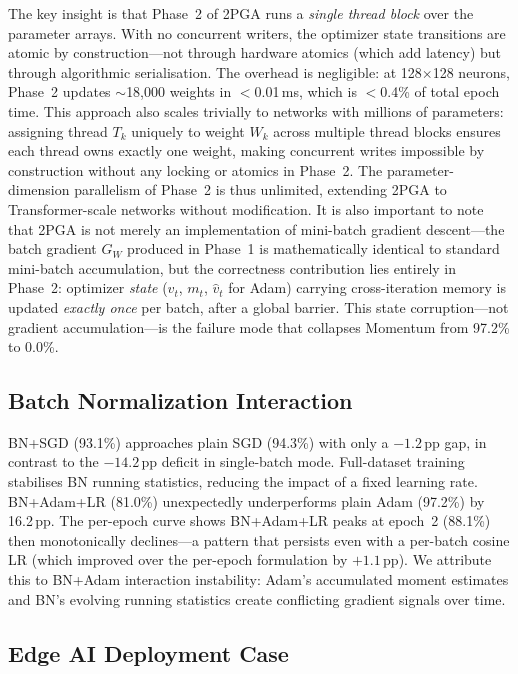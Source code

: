 \documentclass[runningheads]{llncs}
\begin{document}
The key insight is that Phase~2 of 2PGA runs a \emph{single thread block}
over the parameter arrays. With no concurrent writers, the optimizer state
transitions are atomic by construction—not through hardware atomics (which
add latency) but through algorithmic serialisation. The overhead is
negligible: at 128$\times$128 neurons, Phase~2 updates $\sim$18,000
weights in $<$0.01\,ms, which is $<$0.4\% of total epoch time. This
approach also scales trivially to networks with millions of parameters:
assigning thread $T_k$ uniquely to weight $W_k$ across multiple thread
blocks ensures each thread owns exactly one weight, making concurrent
writes impossible by construction without any locking or atomics in
Phase~2. The parameter-dimension parallelism of Phase~2 is thus unlimited,
extending 2PGA to Transformer-scale networks without modification. It is
also important to note that 2PGA is not merely an implementation of
mini-batch gradient descent—the batch gradient $G_W$ produced in Phase~1
is mathematically identical to standard mini-batch accumulation, but the
correctness contribution lies entirely in Phase~2: optimizer \emph{state}
($v_t$, $m_t$, $\hat{v}_t$ for Adam) carrying cross-iteration memory is
updated \emph{exactly once} per batch, after a global barrier. This state
corruption—not gradient accumulation—is the failure mode that collapses
Momentum from 97.2\% to 0.0\%.

\subsection{Batch Normalization Interaction}

BN+SGD (93.1\%) approaches plain SGD (94.3\%) with only a $-1.2$\,pp gap,
in contrast to the $-14.2$\,pp deficit in single-batch mode. Full-dataset
training stabilises BN running statistics, reducing the impact of a fixed
learning rate. BN+Adam+LR (81.0\%) unexpectedly underperforms plain Adam
(97.2\%) by 16.2\,pp. The per-epoch curve shows BN+Adam+LR peaks at
epoch~2 (88.1\%) then monotonically declines—a pattern that persists even
with a per-batch cosine LR (which improved over the per-epoch formulation
by $+1.1$\,pp). We attribute this to BN+Adam interaction instability:
Adam's accumulated moment estimates and BN's evolving running statistics
create conflicting gradient signals over time.

\subsection{Edge AI Deployment Case}
\end{document}
